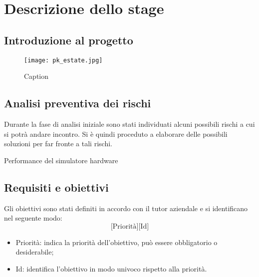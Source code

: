 
\chapter{Descrizione dello stage}
\label{cap:descrizione-stage}


\section{Introduzione al progetto}

\begin{figure}[!ht]
    \centering
    \texttt{[image: pk\_estate.jpg]}
    \caption{Caption}
\end{figure}
\lipsum[1]

\section{Analisi preventiva dei rischi}

Durante la fase di analisi iniziale sono stati individuati alcuni possibili
rischi a cui si potrà andare incontro. Si è quindi proceduto a elaborare delle
possibili soluzioni per far fronte a tali rischi.

\begin{risk}{Performance del simulatore hardware}
    \label{risk:hardware-simulator}
\end{risk}

\section{Requisiti e obiettivi}
Gli obiettivi sono stati definiti in accordo con il tutor aziendale e si
identificano nel seguente modo:
\[
    \text{[Priorità][Id]}
\]
\begin{itemize}
    \item Priorità: indica la priorità dell'obiettivo, può essere obbligatorio o
          desiderabile;
    \item Id: identifica l'obiettivo in modo univoco rispetto alla priorità.
\end{itemize}

